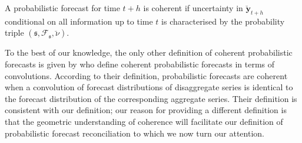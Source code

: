\documentclass[12pt]{article}
\theoremstyle{definition}
\begin{document}
A probabilistic forecast for time $t+h$ is coherent if uncertainty in $\bm{\breve{y}}_{t+h}$ conditional on all information up to time $t$ is characterised by the probability triple $(\mathfrak{s},\mathscr{F}_{\mathfrak{s}},\breve{\nu})$.

To the best of our knowledge, the only other definition of coherent probabilistic forecasts is given by \citet{BenTaieb2017} who define coherent probabilistic forecasts in terms of convolutions. According to their definition, probabilistic forecasts are coherent when a convolution of forecast distributions of disaggregate series is identical to the forecast distribution of the corresponding aggregate series. Their definition is consistent with our definition; our reason for providing a different definition is that the geometric understanding of coherence will facilitate our definition of probabilistic forecast reconciliation to which we now turn our attention.

%
%	
%
\end{document}
